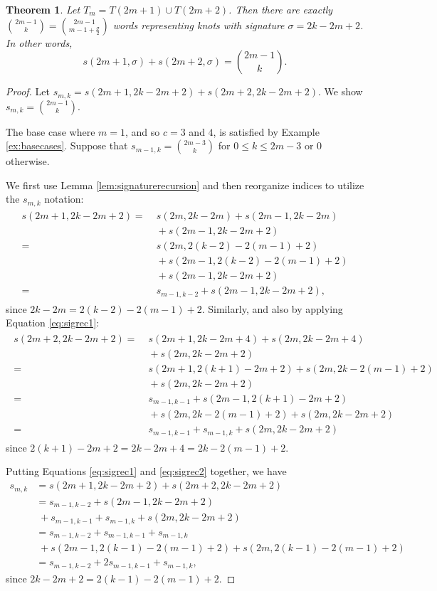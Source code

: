 \documentclass[12pt]{amsart}
\newtheorem{theorem}{Theorem}[section]
\theoremstyle{definition}
\theoremstyle{remark}
\numberwithin{equation}{section}
\begin{document}
\begin{theorem}
\label{thm:binomials}
Let $T_m=T(2m+1)\cup T(2m+2)$. Then there are exactly 
$\binom{2m-1}{k}=\binom{2m-1}{m-1+\frac{\sigma}{2}}$ words representing knots with signature $\sigma=2k-2m+2$. In other words, 
\[s(2m+1,\sigma) + s(2m+2,\sigma) = \binom{2m-1}{k}.\]
\end{theorem}

\begin{proof}
Let $s_{m,k}=s(2m+1,2k-2m+2)+s(2m+2,2k-2m+2)$.  We show $s_{m,k}=\binom{2m-1}{k}$.

The base case where $m=1$, and so $c=3$ and $4$, is satisfied by Example \ref{ex:basecases}.  Suppose that $s_{m-1,k}=\binom{2m-3}{k}$ for $0\leq k \leq 2m-3$ or 0 otherwise.

We first use Lemma \ref{lem:signaturerecursion} and then reorganize indices to utilize the $s_{m,k}$ notation: 
\begin{align}
\begin{split}
\label{eq:sigrec1}
s(2m+1,2k-2m+2) = & \; s(2m,2k-2m)+s(2m-1,2k-2m)\\
& \; +s(2m-1,2k-2m+2)  \\
 = &\; s(2m,2(k-2)-2(m-1)+2)\\
& \; + s(2m-1,2(k-2)-2(m-1)+2)  \\
& \; +s(2m-1,2k-2m+2) \\
 = & \; s_{m-1,k-2}+s(2m-1,2k-2m+2),
\end{split}
\end{align}
since $2k-2m=2(k-2)-2(m-1)+2$.  Similarly, and also by applying Equation \eqref{eq:sigrec1}:
\begin{align}
\begin{split}
\label{eq:sigrec2}
s(2m+2,2k-2m+2)  = & \; s(2m+1,2k-2m+4)+s(2m,2k-2m+4)\\
& \; +s(2m,2k-2m+2)  \\
 = &\; s(2m+1,2(k+1)-2m+2)+s(2m,2k-2(m-1)+2)\\
& \; +s(2m,2k-2m+2)  \\
 = &\; s_{m-1,k-1} + s(2m-1,2(k+1)-2m+2)  \\
& \; +s(2m,2k-2(m-1)+2)+s(2m,2k-2m+2) \\
 = &\; s_{m-1,k-1} + s_{m-1,k} + s(2m,2k-2m+2)
\end{split}
\end{align}
since $2(k+1)-2m+2=2k-2m+4=2k-2(m-1)+2$.

Putting Equations \eqref{eq:sigrec1} and \eqref{eq:sigrec2} 
together, we have
\begin{align*}
s_{m,k} & = s(2m+1,2k-2m+2)+s(2m+2,2k-2m+2)\\
& = s_{m-1,k-2}+s(2m-1,2k-2m+2)\\
& \; + s_{m-1,k-1} + s_{m-1,k} + s(2m,2k-2m+2)\\
& = s_{m-1,k-2} + s_{m-1,k-1} + s_{m-1,k}\\
& \; + s(2m-1,2(k-1)-2(m-1)+2) + s(2m,2(k-1)-2(m-1)+2)\\
& = s_{m-1,k-2} + 2s_{m-1,k-1} + s_{m-1,k},
\end{align*}
since $2k-2m+2=2(k-1)-2(m-1)+2$.


\end{proof}
\end{document}
